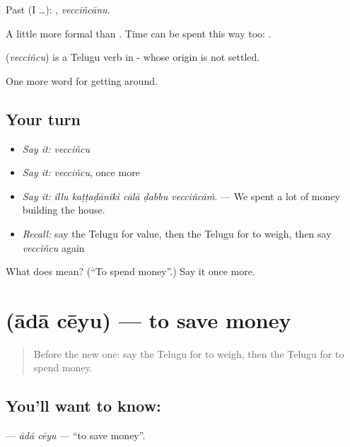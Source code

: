 Past (I …): , \emph{vecciñcānu}.

A little more formal than  . Time can be spent this way too:  .

\begin{cousinweb}
\textbf{} (\emph{vecciñcu}) is a Telugu verb in - whose origin is not settled.
\end{cousinweb}

\begin{grammarlens}[title={What you've built}]
One more word for getting around.
\end{grammarlens}

\subsection*{Your turn}
\begin{itemize}
\raggedright
  \item \emph{Say it:} \emph{vecciñcu}
  \item \emph{Say it:} \emph{vecciñcu}, once more
  \item \emph{Say it:} \emph{illu kaṭṭaḍāniki cālā ḍabbu vecciñcāṁ.} — We spent a lot of money building the house.
  \item \emph{Recall:} say the Telugu for value, then the Telugu for to weigh, then say \emph{vecciñcu} again
\end{itemize}

\begin{tcolorbox}[breakable,colback=teal!4,colframe=teal!35!black,title={Before you move on}]
What does  mean? (\textquotedblleft{}To spend money\textquotedblright{}.) Say it once more.
\end{tcolorbox}
\section[\texorpdfstring{\te{ఆదా} \te{చేయు} (ādā cēyu)}{ఆదా చేయు (ādā cēyu)}]{  (ādā cēyu) — to save money}

\label{lesson:TE-C487-ada-ceyu}



\begin{quote}
Before the new one: say the Telugu for to weigh, then the Telugu for to spend money.
\end{quote}

\subsection*{You'll want to know:  }
\textbf{ } — \emph{ādā cēyu} — \textquotedblleft{}to save money\textquotedblright{}.

